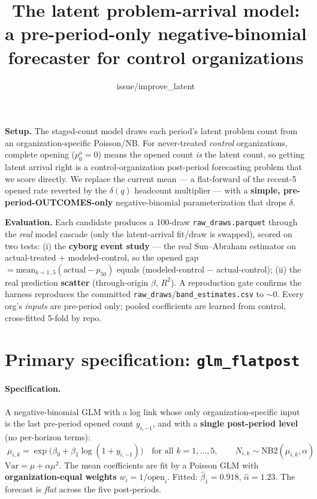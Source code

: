 \documentclass[11pt]{article}
\title{The latent problem-arrival model:\\ a pre-period-only negative-binomial forecaster for control organizations}
\author{issue/improve\_latent}
\date{}
\begin{document}
\maketitle

\noindent\textbf{Setup.} The staged-count model draws each period's latent problem count from an organization-specific Poisson/NB. For never-treated \emph{control} organizations, complete opening ($p^o_0=0$) means the opened count \emph{is} the latent count, so getting latent arrival right is a control-organization post-period forecasting problem that we score directly. We replace the current mean --- a flat-forward of the recent-5 opened rate reverted by the $\delta(q)$ headcount multiplier --- with a \textbf{simple, pre-period-OUTCOMES-only} negative-binomial parameterization that drops $\delta$.

\medskip
\noindent\textbf{Evaluation.} Each candidate produces a 100-draw \texttt{raw\_draws.parquet} through the \emph{real} model cascade (only the latent-arrival fit/draw is swapped), scored on two tests: (i) the \textbf{cyborg event study} --- the real Sun--Abraham estimator on actual-treated $+$ modeled-control, so the opened gap $=\text{mean}_{k=1..5}(\text{actual}-p_{50})$ equals (modeled-control $-$ actual-control); (ii) the real prediction \textbf{scatter} (through-origin $\beta$, $R^2$). A reproduction gate confirms the harness reproduces the committed \texttt{raw\_draws}/\texttt{band\_estimates.csv} to $\sim$0. Every org's \emph{inputs} are pre-period only; pooled coefficients are learned from control, cross-fitted 5-fold by repo.

\section{Primary specification: \texttt{glm\_flatpost}}

\paragraph{Specification.} A negative-binomial GLM with a log link whose only organization-specific input is the last pre-period opened count $y_{i,-1}$, and with a \textbf{single post-period level} (no per-horizon terms):
\[
\boxed{\;\mu_{i,k}=\exp\!\big(\beta_0+\beta_1\log(1+y_{i,-1})\big)\quad\text{for all }k=1,\dots,5,\qquad
N_{i,k}\sim\mathrm{NB2}(\mu_{i,k},\alpha)\;}
\]
$\mathrm{Var}=\mu+\alpha\mu^2$. The mean coefficients are fit by a Poisson GLM with \textbf{organization-equal weights} $w_i=1/\overline{\text{open}}_i$. Fitted: $\hat\beta_1=0.918$, $\hat\alpha=1.23$. The forecast is \emph{flat} across the five post-periods.
\end{document}
